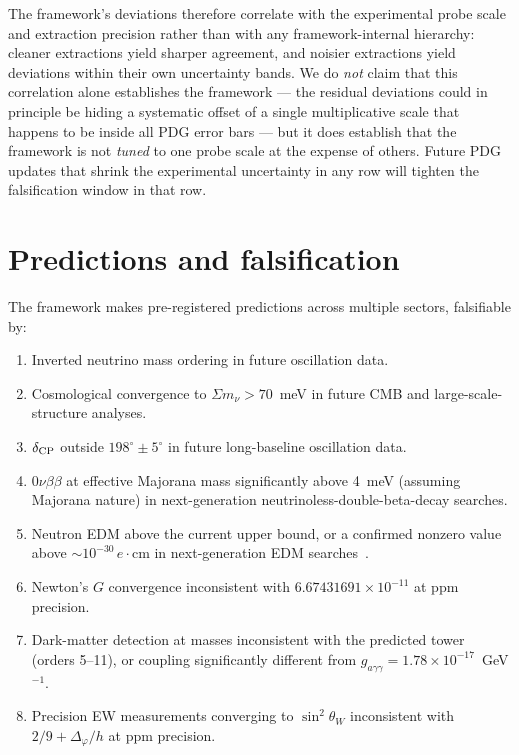 ﻿\documentclass[reprint,amsmath,amssymb,aps,prd,longbibliography,floatfix]{revtex4-2}
\providecommand{\degree}{^{\circ}}
\begin{document}
\noindent The framework's deviations therefore correlate with the
experimental probe scale and extraction precision rather than with
any framework-internal hierarchy: cleaner extractions yield
sharper agreement, and noisier extractions yield deviations within
their own uncertainty bands. We do \emph{not} claim that this
correlation alone establishes the framework --- the residual
deviations could in principle be hiding a systematic offset of a
single multiplicative scale that happens to be inside all PDG
error bars --- but it does establish that the framework is not
\emph{tuned} to one probe scale at the expense of others. Future
PDG updates that shrink the experimental uncertainty in any row
will tighten the falsification window in that row.

\section{Predictions and falsification}
\label{sec:predictions}

The framework makes pre-registered predictions across multiple sectors,
falsifiable by:
\begin{enumerate}
\item Inverted neutrino mass ordering in future oscillation data.
\item Cosmological convergence to $\Sigma m_\nu > 70$~meV in future CMB and large-scale-structure analyses.
\item $\delta_{\rm CP}$ outside $198\degree \pm 5\degree$ in future long-baseline oscillation data.
\item $0\nu\beta\beta$ at effective Majorana mass significantly above
4~meV (assuming Majorana nature) in next-generation
neutrinoless-double-beta-decay searches.
\item Neutron EDM above the current upper bound, or a confirmed nonzero
value above $\sim 10^{-30}\,e \cdot \text{cm}$ in next-generation EDM
searches~\cite{nEDM2020}.
\item Newton's $G$ convergence inconsistent with $6.67431691 \times 10^{-11}$
at ppm precision.
\item Dark-matter detection at masses inconsistent with the predicted
tower (orders 5--11), or coupling significantly different from
$g_{a\gamma\gamma} = 1.78 \times 10^{-17}$~GeV$^{-1}$.
\item Precision EW measurements converging to $\sin^2\theta_W$
inconsistent with $2/9 + \Delta_\varphi/h$ at ppm precision.
\end{enumerate}
\end{document}
